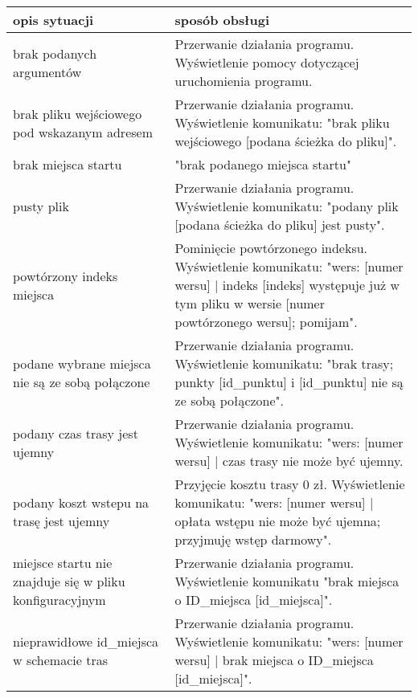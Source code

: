 \documentclass{article}
\begin{document}
\begin{sloppypar}
\begin{tabular}{|p{0.4\linewidth}|p{0.6\linewidth}|} \hline
opis sytuacji   &   sposób obsługi \\ \hline
brak podanych argumentów & Przerwanie działania programu. Wyświetlenie pomocy dotyczącej uruchomienia programu. \\ \hline
brak pliku wejściowego pod wskazanym adresem &   Przerwanie działania programu. Wyświetlenie komunikatu: "brak pliku wejściowego [podana ścieżka do pliku]". \\ \hline
brak miejsca startu & "brak podanego miejsca startu"\\ \hline
pusty plik  & Przerwanie działania programu. Wyświetlenie komunikatu: "podany plik [podana ścieżka do pliku] jest pusty".  \\ \hline
powtórzony indeks miejsca & Pominięcie powtórzonego indeksu. Wyświetlenie komunikatu: "wers: [numer wersu] | indeks [indeks] występuje już w tym pliku w wersie [numer powtórzonego wersu]; pomijam". \\ \hline
podane wybrane miejsca nie są ze sobą połączone &  Przerwanie działania programu. Wyświetlenie komunikatu: "brak trasy; punkty [id\_punktu] i [id\_punktu] nie są ze sobą połączone".\\ \hline
podany czas trasy jest ujemny & Przerwanie działania programu. Wyświetlenie komunikatu: "wers: [numer wersu] | czas trasy nie może być ujemny.\\ \hline
podany koszt wstepu na trasę jest ujemny & Przyjęcie kosztu trasy 0 zł. Wyświetlenie komunikatu: "wers: [numer wersu] | opłata wstępu nie może być ujemna; przyjmuję wstęp darmowy".\\ \hline
miejsce startu nie znajduje się w pliku konfiguracyjnym &  Przerwanie działania programu. Wyświetlenie komunikatu "brak miejsca o ID\_miejsca [id\_miejsca]". \\ \hline
nieprawidłowe id\_miejsca w schemacie tras &  Przerwanie działania programu. Wyświetlenie komunikatu: "wers: [numer wersu] | brak miejsca o ID\_miejsca [id\_miejsca]".\\ \hline
\end{tabular}
\end{sloppypar}
\end{document}
